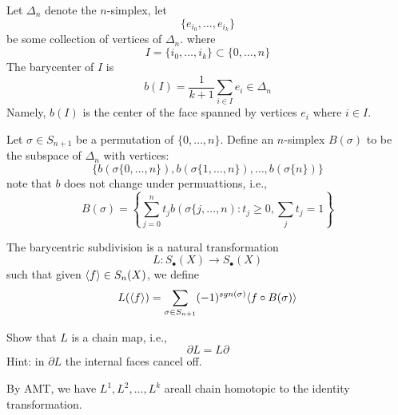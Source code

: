 \begin{defn}[barycenter]
    Let $\Delta_n$ denote the $n$-simplex, let
    \begin{equation*}
        \{e_{i_0},\dots, e_{i_k}\}
    \end{equation*}
    be some collection of vertices of $\Delta_n$. where 
    \begin{equation*}
        I=\{i_0,\dots,i_k\}\subset\{0,\dots, n\}
    \end{equation*}
    The barycenter of $I$ is 
    \begin{equation*}
        b(I)=\frac{1}{k+1}\sum_{i\in I}e_i\in \Delta_n
    \end{equation*}
    Namely, $b(I)$ is the center of the face spanned by vertices $e_i$ where $i\in I$.
\end{defn}
Let $\sigma\in S_{n+1}$ be a permutation of $\{0,\dots, n\}$. Define an $n$-simplex $B(\sigma)$ to be the subspace of $\Delta_n$ with vertices:
\begin{equation*}
    \{b(\sigma\{0,\dots,n\}), b(\sigma\{1,\dots,n\}), \dots, b(\sigma\{n\})\}
\end{equation*}
note that $b$ does not change under permuattions, i.e., 
\begin{equation*}
    B(\sigma)=\left\{\sum_{j=0}^nt_jb(\sigma\{j,\dots,n):t_j\geq 0, \sum_jt_j=1\right\}
\end{equation*}
\begin{defn}
    The barycentric subdivision is a natural transformation 
    \begin{equation*}
        L: S_\bullet(X)\to S_\bullet(X)
    \end{equation*}
    such that given $\langle f\rangle\in S_n(X)$, we define 
    \begin{equation*}
        L(\langle f\rangle)=\sum_{\sigma\in S_{n+1}}(-1)^{sgn(\sigma)}\langle f\circ B(\sigma)\rangle
    \end{equation*}
\end{defn}
\begin{prob}[HW(3.4)]
    Show that $L$ is a chain map, i.e., 
    \begin{equation*}
        \partial L=L\partial
    \end{equation*}
    Hint: in $\partial L$ the internal faces cancel off.
\end{prob}
\begin{cor}
    By AMT, we have $L^1, L^2,\dots, L^k$ areall chain homotopic to the identity transformation.
\end{cor}

